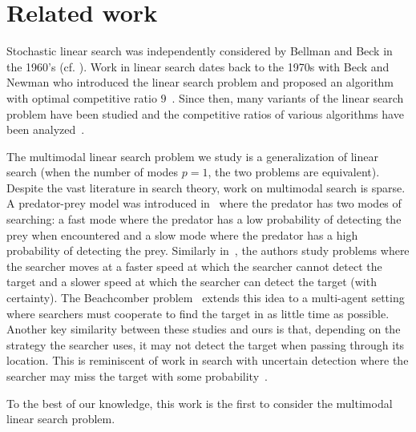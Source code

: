 \section{Related work}
Stochastic linear search was independently considered by Bellman and Beck in the 1960's (cf. \cite{beck1964linear,bellman1963optimal}). Work in linear search dates back to the 1970s with Beck and Newman who introduced the linear search problem and proposed an algorithm with optimal competitive ratio $9$~\cite{beck1970linearsearch}.
Since then, many variants of the linear search problem have been studied and the competitive ratios of various algorithms have been analyzed~\cite{gal_search_games,baeza_yates,group_search,search_plane}. %

The multimodal linear search problem we study is a generalization of linear search (when the number of modes $p=1$, the two problems are equivalent).
Despite the vast literature in search theory, work on multimodal search is sparse.
A predator-prey model was introduced in~\cite{knoppien1985predators} where the predator has two modes of searching: a fast mode where the predator has a low probability of detecting the prey when encountered and a slow mode where the predator has a high probability of detecting the prey.
Similarly in~\cite{benichou2011intermittent}, the authors study problems where the searcher moves at a faster speed at which the searcher cannot detect the target and a slower speed at which the searcher can detect the target (with certainty).
The Beachcomber problem~\cite{beachcomber} extends this idea to a multi-agent setting where searchers must cooperate to find the target in as little time as possible.
Another key similarity between these studies and ours is that, depending on the strategy the searcher uses, it may not detect the target when passing through its location.
This is reminiscent of work in search with uncertain detection where the searcher may miss the target with some probability~\cite{gal_search_games,probabilistic_faults}.  %

To the best of our knowledge, this work is the first to consider the multimodal linear search problem.